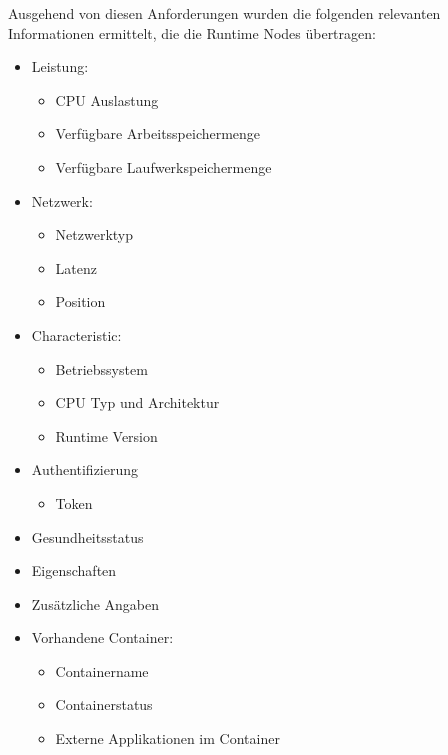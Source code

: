 Ausgehend von diesen Anforderungen wurden die folgenden relevanten Informationen ermittelt, die die Runtime Nodes übertragen:

\begin{itemize}
    \item Leistung: 
    \begin{itemize}
        \item CPU Auslastung
        \item Verfügbare Arbeitsspeichermenge
        \item Verfügbare Laufwerkspeichermenge
    \end{itemize} 
    \item Netzwerk:
    \begin{itemize}
        \item Netzwerktyp
        \item Latenz
        \item Position
    \end{itemize}
    \item Characteristic:
    \begin{itemize}
        \item Betriebssystem
        \item CPU Typ und Architektur
        \item Runtime Version
    \end{itemize}
    \item Authentifizierung
    \begin{itemize}
        \item Token
    \end{itemize}
    \item Gesundheitsstatus
    \item Eigenschaften
    \item Zusätzliche Angaben
    \item Vorhandene Container:
    \begin{itemize}
        \item Containername
        \item Containerstatus
        \item Externe Applikationen im Container
    \end{itemize}
\end{itemize}

